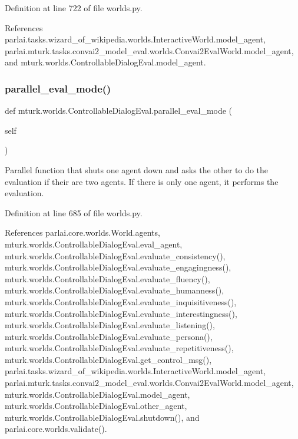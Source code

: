 Definition at line 722 of file worlds.\+py.



References parlai.\+tasks.\+wizard\+\_\+of\+\_\+wikipedia.\+worlds.\+Interactive\+World.\+model\+\_\+agent, parlai.\+mturk.\+tasks.\+convai2\+\_\+model\+\_\+eval.\+worlds.\+Convai2\+Eval\+World.\+model\+\_\+agent, and mturk.\+worlds.\+Controllable\+Dialog\+Eval.\+model\+\_\+agent.

\mbox{\label{classmturk_1_1worlds_1_1ControllableDialogEval_a06c86b010d4db36333eb3f520dfc926b}} 
\subsubsection{\texorpdfstring{parallel\+\_\+eval\+\_\+mode()}{parallel\_eval\_mode()}}
{\footnotesize\ttfamily def mturk.\+worlds.\+Controllable\+Dialog\+Eval.\+parallel\+\_\+eval\+\_\+mode (\begin{DoxyParamCaption}\item[{}]{self }\end{DoxyParamCaption})}

\begin{DoxyVerb}Parallel function that shuts one agent down and asks the other
to do the evaluation if their are two agents. If there is only
one agent, it performs the evaluation.
\end{DoxyVerb}
 

Definition at line 685 of file worlds.\+py.



References parlai.\+core.\+worlds.\+World.\+agents, mturk.\+worlds.\+Controllable\+Dialog\+Eval.\+eval\+\_\+agent, mturk.\+worlds.\+Controllable\+Dialog\+Eval.\+evaluate\+\_\+consistency(), mturk.\+worlds.\+Controllable\+Dialog\+Eval.\+evaluate\+\_\+engagingness(), mturk.\+worlds.\+Controllable\+Dialog\+Eval.\+evaluate\+\_\+fluency(), mturk.\+worlds.\+Controllable\+Dialog\+Eval.\+evaluate\+\_\+humanness(), mturk.\+worlds.\+Controllable\+Dialog\+Eval.\+evaluate\+\_\+inquisitiveness(), mturk.\+worlds.\+Controllable\+Dialog\+Eval.\+evaluate\+\_\+interestingness(), mturk.\+worlds.\+Controllable\+Dialog\+Eval.\+evaluate\+\_\+listening(), mturk.\+worlds.\+Controllable\+Dialog\+Eval.\+evaluate\+\_\+persona(), mturk.\+worlds.\+Controllable\+Dialog\+Eval.\+evaluate\+\_\+repetitiveness(), mturk.\+worlds.\+Controllable\+Dialog\+Eval.\+get\+\_\+control\+\_\+msg(), parlai.\+tasks.\+wizard\+\_\+of\+\_\+wikipedia.\+worlds.\+Interactive\+World.\+model\+\_\+agent, parlai.\+mturk.\+tasks.\+convai2\+\_\+model\+\_\+eval.\+worlds.\+Convai2\+Eval\+World.\+model\+\_\+agent, mturk.\+worlds.\+Controllable\+Dialog\+Eval.\+model\+\_\+agent, mturk.\+worlds.\+Controllable\+Dialog\+Eval.\+other\+\_\+agent, mturk.\+worlds.\+Controllable\+Dialog\+Eval.\+shutdown(), and parlai.\+core.\+worlds.\+validate().

